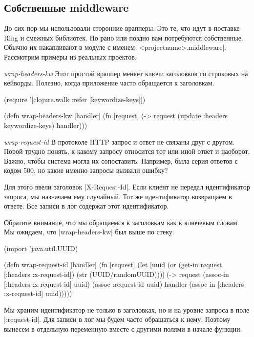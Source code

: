 \subsection{Собственные middleware}

До сих пор мы использовали сторонние врапперы. Это те, что идут в поставке Ring
и смежных библиотек. Но рано или поздно вам потребуются собственные. Обычно их
накапливают в модуле с именем \spverb|<projectname>.middleware|. Рассмотрим примеры из
реальных проектов.

\emph{wrap-headers-kw} Этот простой враппер меняет ключи заголовков со строковых
на кейворды. Полезно, когда приложение часто обращается к заголовкам.

\begin{code}
(require
 '[clojure.walk :refer [keywordize-keys]])

(defn wrap-headers-kw
  [handler]
  (fn [request]
    (-> request
      (update :headers keywordize-keys)
      handler)))
\end{code}



\emph{wrap-request-id} В протоколе HTTP запрос и ответ не связаны друг с
другом. Порой трудно понять, к какому запросу относится тот или иной ответ и
наоборот. Важно, чтобы система могла их сопоставить. Например, была серия
ответов с кодом 500, но какие именно запросы вызвали ошибку?

Для этого ввели заголовок \spverb|X-Request-Id|. Если клиент не передал идентификатор
запроса, мы назначаем ему случайный. Тот же идентификатор возвращаем в
ответе. Все записи в лог содержат этот идентификатор.

Обратите внимание, что мы обращаемся к заголовкам как к ключевым словам. Мы
ожидаем, что \spverb|wrap-headers-kw| был выше по стеку.

\begin{code}
(import 'java.util.UUID)

(defn wrap-request-id
  [handler]
  (fn [request]
    (let [uuid (or (get-in request [:headers :x-request-id])
                   (str (UUID/randomUUID)))]
      (-> request
          (assoc-in [:headers :x-request-id] uuid)
          (assoc :request-id uuid)
          handler
          (assoc-in [:headers :x-request-id] uuid)))))
\end{code}

Мы храним идентификатор не только в заголовках, но и на уровне запроса в поле
\spverb|:request-id|. Для записи в лог мы будем часто обращаться к нему. Поэтому
вынесем в отдельную переменную вместе с другими полями в начале функции:

